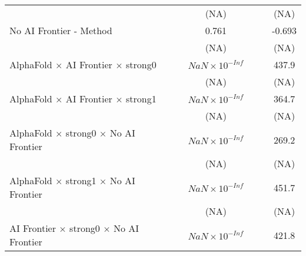 \begin{tabular}{lcccccc}
                                                                              &                        &                        & (NA)                   &         &        & (NA)\\   
   No AI Frontier - Method                                                    &                        &                        & 0.761                  &         &        & -0.693\\   
                                                                              &                        &                        & (NA)                   &         &        & (NA)\\   
   AlphaFold $\times$ AI Frontier $\times$ strong0                            &                        &                        & $NaN\times 10^{-Inf}$  &         &        & 437.9\\   
                                                                              &                        &                        & (NA)                   &         &        & (NA)\\   
   AlphaFold $\times$ AI Frontier $\times$ strong1                            &                        &                        & $NaN\times 10^{-Inf}$  &         &        & 364.7\\   
                                                                              &                        &                        & (NA)                   &         &        & (NA)\\   
   AlphaFold $\times$ strong0 $\times$ No AI Frontier                         &                        &                        & $NaN\times 10^{-Inf}$  &         &        & 269.2\\   
                                                                              &                        &                        & (NA)                   &         &        & (NA)\\   
   AlphaFold $\times$ strong1 $\times$ No AI Frontier                         &                        &                        & $NaN\times 10^{-Inf}$  &         &        & 451.7\\   
                                                                              &                        &                        & (NA)                   &         &        & (NA)\\   
   AI Frontier $\times$ strong0 $\times$ No AI Frontier                       &                        &                        & $NaN\times 10^{-Inf}$  &         &        & 421.8\\   

\end{tabular}
